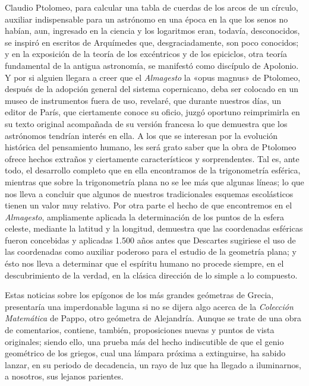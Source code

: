 \documentclass[a4paper, 12pt, draft]{article}
\begin{document}
{Claudio Ptolomeo, para calcular una tabla de cuerdas de los arcos de un círculo, auxiliar indispensable para un astrónomo en una época en la que los senos no habían, aun, ingresado en la ciencia y los logaritmos eran, todavía, desconocidos, se inspiró en escritos de Arquímedes que, desgraciadamente, son poco conocidos; y en la exposición de la teoría de los excéntricos y de los epiciclos, otra teoría fundamental de la antigua astronomía, se manifestó como discípulo de Apolonio. Y por si alguien llegara a creer que el \textit{ Almagesto} la «opus magnus» de Ptolomeo, después de la adopción general del sistema copernicano, deba ser colocado en un museo de instrumentos fuera de uso, revelaré, que durante nuestros días, un editor de París, que ciertamente conoce su oficio,
juzgó oportuno reimprimirla en su texto original acompañada de su versión francesa
lo que demuestra que los astrónomos tendrían interés en ella. A los que se interesan por la evolución histórica del pensamiento humano, les será grato saber que la obra de Ptolomeo ofrece hechos extraños y ciertamente característicos y sorprendentes. Tal es, ante todo, el desarrollo completo que en ella encontramos de la trigonometría esférica, mientras que sobre la trigonometría plana no se lee más que algunas líneas; lo que nos lleva a concluir que algunos de nuestros tradicionales esquemas escolásticos tienen un valor muy relativo. Por otra parte el hecho de que encontremos en el \textit{ Almagesto}, ampliamente aplicada la determinación de los puntos de la esfera celeste, mediante la latitud y la longitud, demuestra que las coordenadas esféricas fueron concebidas y aplicadas 1.500 años antes que Descartes sugiriese el uso de las coordenadas como auxiliar poderoso para el estudio de la geometría plana; y ésto nos lleva a determinar que el espíritu humano no procede siempre, en el descubrimiento de la verdad, en la clásica dirección de lo simple a lo compuesto.

Estas noticias sobre los epígonos de los más grandes geómetras de Grecia, presentaría una imperdonable laguna si no se dijera algo acerca de la \textit{ Colección Matemática} de Pappo, otro geómetra de Alejandría. Aunque se trate de una obra de comentarios, contiene, también, proposiciones nuevas y puntos de vista originales; siendo ello, una prueba más del hecho indiscutible de que el genio geométrico de los griegos, cual una lámpara próxima a
extinguirse, ha sabido lanzar, en su periodo de decadencia, un rayo de luz que ha llegado a iluminarnos, a	nosotros, sus lejanos parientes.

}
\end{document}
